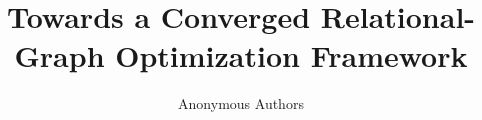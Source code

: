 \documentclass[sigconf]{acmart}
\begin{document}
\title{Towards a Converged Relational-Graph Optimization Framework}

\author{Anonymous Authors}





\keywords{}

\maketitle



%
%


%
%






\end{document}
